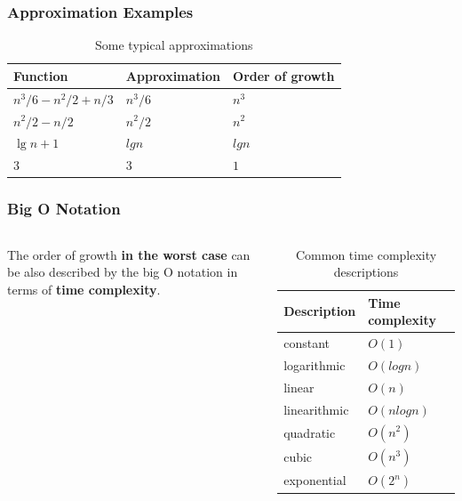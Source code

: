 \documentclass[aspectratio=169, 14pt]{beamer}
\begin{document}
\begin{frame}[fragile]
    \frametitle{Approximation Examples}

    \begin{table}
        \caption{Some typical approximations}
        \begin{tabular}{lll}
          \toprule
          Function & Approximation & Order of growth \\
          \midrule
          $n^3/6 - n^2/2 + n/3$ & $n^3/6$ & $n^3$ \\
          $n^2/2 - n/2$ & $n^2/2$ & $n^2$ \\
          $\lg{n} + 1$ & $lg{n}$ & $lg{n}$ \\
          $3$ & $3$ & $1$ \\
          \bottomrule
        \end{tabular}
    \end{table}
\end{frame}
\begin{frame}
    \frametitle{Big O Notation}

    \begin{columns}
        The order of growth \textbf{in the worst case} can be also described by the \alert{big O} notation in terms of \textbf{time complexity}. 
        \begin{table}
            \caption{Common time complexity descriptions}
            \begin{tabular}{ll}
              \toprule
              Description & Time complexity \\
              \midrule
              constant	& $O(1)$ \\
        logarithmic	& $O(log{n})$ \\
        linear	& $O(n)$ \\
        linearithmic	& $O(nlog{n})$ \\
        quadratic	& $O(n^2)$ \\
        cubic	& $O(n^3)$ \\
        exponential	& $O(2^n)$ \\
              \bottomrule
            \end{tabular}
        \end{table}
    \end{columns}
\end{frame}
\end{document}
